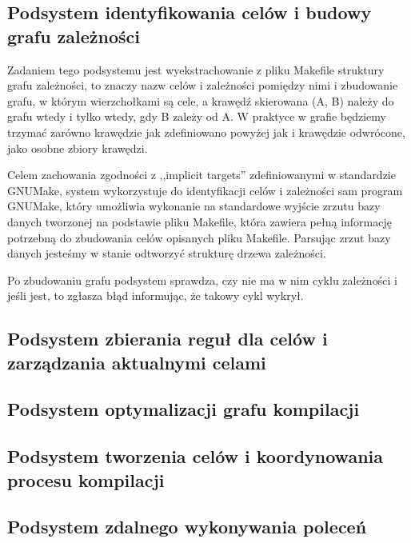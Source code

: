 \documentclass[a4paper]{article}
\begin{document}

\subsection{Podsystem identyfikowania celów i budowy grafu zależności}

Zadaniem tego podsystemu jest wyekstrachowanie z pliku Makefile struktury grafu zależności, to znaczy nazw celów i zależności pomiędzy nimi i zbudowanie grafu, w którym wierzchołkami są cele, a krawędź skierowana (A, B) należy do grafu wtedy i tylko wtedy, gdy B zależy od A.
W praktyce w grafie będziemy trzymać zarówno krawędzie jak zdefiniowano powyżej jak i krawędzie odwrócone, jako osobne zbiory krawędzi.

Celem zachowania zgodności z ,,implicit targets'' zdefiniowanymi w standardzie GNUMake, system wykorzystuje do identyfikacji celów i zależności sam program GNUMake, który umożliwia wykonanie na standardowe wyjście zrzutu bazy danych tworzonej na podstawie pliku Makefile, która zawiera pełną informację potrzebną do zbudowania celów opisanych pliku Makefile.
Parsując zrzut bazy danych jesteśmy w stanie odtworzyć strukturę drzewa zależności.

Po zbudowaniu grafu podsystem sprawdza, czy nie ma w nim cyklu zależności i jeśli jest, to zgłasza błąd informując, że takowy cykl wykrył.

\subsection{Podsystem zbierania reguł dla celów i zarządzania aktualnymi celami}


\subsection{Podsystem optymalizacji grafu kompilacji}


\subsection{Podsystem tworzenia celów i koordynowania procesu kompilacji}


\subsection{Podsystem zdalnego wykonywania poleceń}
\end{document}
